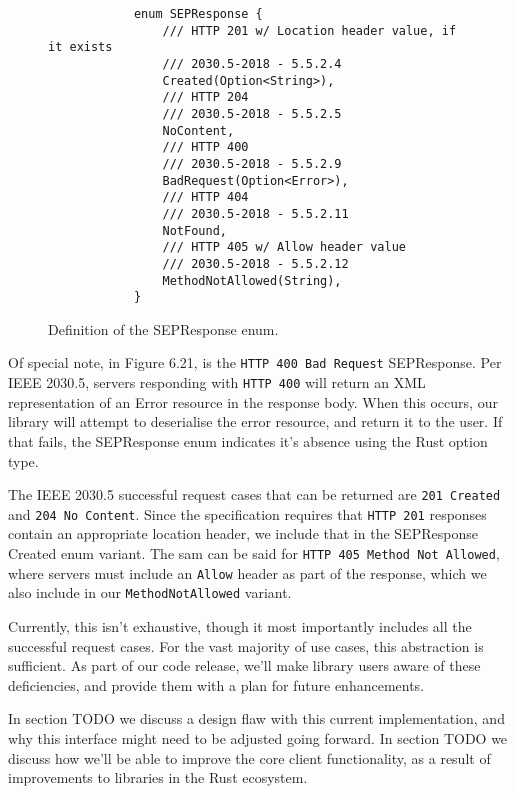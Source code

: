 \begin{figure}[h]
    \begin{center}
        \begin{lstlisting}
            enum SEPResponse {
                /// HTTP 201 w/ Location header value, if it exists
                /// 2030.5-2018 - 5.5.2.4
                Created(Option<String>),
                /// HTTP 204
                /// 2030.5-2018 - 5.5.2.5
                NoContent,
                /// HTTP 400 
                /// 2030.5-2018 - 5.5.2.9
                BadRequest(Option<Error>),
                /// HTTP 404 
                /// 2030.5-2018 - 5.5.2.11
                NotFound,
                /// HTTP 405 w/ Allow header value 
                /// 2030.5-2018 - 5.5.2.12
                MethodNotAllowed(String),
            }
        \end{lstlisting}
        \label{fig:sepresponse}
        \vspace{-10pt}
        \caption{Definition of the SEPResponse enum.}
    \end{center}
\end{figure}

Of special note, in Figure 6.21, is the \texttt{HTTP 400 Bad Request} SEPResponse. Per IEEE 2030.5, servers responding with \texttt{HTTP 400} will return an XML representation of an Error resource in the response body. When this occurs, our library will attempt to deserialise the error resource, and return it to the user. If that fails, the SEPResponse enum indicates it's absence using the Rust option type.

The IEEE 2030.5 successful request cases that can be returned are \texttt{201 Created} and \texttt{204 No Content}. Since the specification requires that \texttt{HTTP 201} responses contain an appropriate location header, we include that in the SEPResponse Created enum variant. The sam can be said for \texttt{HTTP 405 Method Not Allowed}, where servers must include an \texttt{Allow} header as part of the response, which we also include in our \texttt{MethodNotAllowed} variant.

Currently, this isn't exhaustive, though it most importantly includes all the successful request cases. For the vast majority of use cases, this abstraction is sufficient. As part of our code release, we'll make library users aware of these deficiencies, and provide them with a plan for future enhancements.

In section TODO we discuss a design flaw with this current implementation, and why this interface might need to be adjusted going forward. In section TODO we discuss how we'll be able to improve the core client functionality, as a result of improvements to libraries in the Rust ecosystem.

